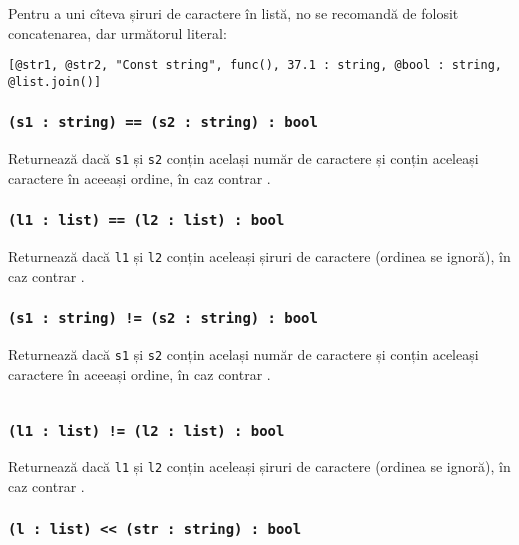Pentru a uni cîteva șiruri de caractere în listă, no se recomandă de folosit concatenarea, dar următorul literal:
\begin{verbatim}
[@str1, @str2, "Const string", func(), 37.1 : string, @bool : string, @list.join()]
\end{verbatim}

\subsubsection{\texttt{(s1 : string) == (s2 : string) : bool}}

Returnează \true{} dacă \texttt{s1} și \texttt{s2} conțin același număr de caractere și conțin aceleași caractere în aceeași ordine, în caz contrar \false{}.

\subsubsection{\texttt{(l1 : list) == (l2 : list) : bool}}

Returnează \true{} dacă \texttt{l1} și \texttt{l2} conțin aceleași șiruri de caractere (ordinea se ignoră), în caz contrar \false{}.

\subsubsection{\texttt{(s1 : string) != (s2 : string) : bool}}

Returnează \false{} dacă \texttt{s1} și \texttt{s2} conțin același număr de caractere și conțin aceleași caractere în aceeași ordine, în caz contrar \true{}.

\begin{sourcecode}
    \label{stringlistopex}
    \inputminted[linenos]{icl}{../sources/stringlistopex.icL}
\end{sourcecode}

\subsubsection{\texttt{(l1 : list) != (l2 : list) : bool}}

Returnează \false{} dacă \texttt{l1} și \texttt{l2} conțin aceleași șiruri de caractere (ordinea se ignoră), în caz contrar \true{}.

\subsubsection{\texttt{(l : list) << (str : string) : bool}}

